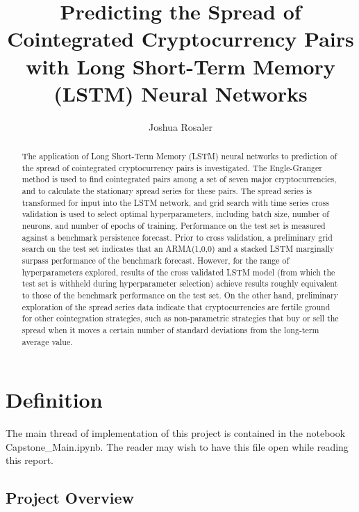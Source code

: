 \documentclass{article}
\begin{document}
\title{Predicting the Spread of Cointegrated Cryptocurrency Pairs with Long Short-Term Memory (LSTM) Neural Networks}
\author{Joshua Rosaler}
\date{}

\maketitle

\begin{abstract}
The application of Long Short-Term Memory (LSTM) neural networks to prediction of the spread of cointegrated cryptocurrency pairs is investigated. The Engle-Granger method is used to find cointegrated pairs among a set of seven major cryptocurrencies, and to calculate the stationary spread series for these pairs. The spread series is transformed for input into the LSTM network, and grid search with time series cross validation is used to select optimal hyperparameters, including batch size, number of neurons, and number of epochs of training. Performance on the test set is measured against a benchmark persistence forecast. Prior to cross validation, a preliminary grid search on the test set indicates that an ARMA(1,0,0) and a stacked LSTM marginally surpass performance of the benchmark forecast. However, for the range of hyperparameters explored, results of the cross validated LSTM model (from which the test set is withheld during hyperparameter selection) achieve results roughly equivalent to those of the benchmark performance on the test set. On the other hand, preliminary exploration of the spread series data indicate that cryptocurrencies are fertile ground for other cointegration strategies, such as non-parametric strategies that buy or sell the spread when it moves a certain number of standard deviations from the long-term average value. 
\end{abstract}

 

\section{Definition}

The main thread of implementation of this project is contained in the notebook Capstone\_Main.ipynb. The reader may wish to have this file open while reading this report. 


\subsection{Project Overview}
 
\end{document}

